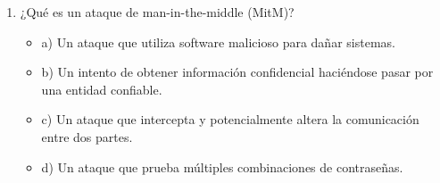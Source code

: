 \documentclass[a4paper]{article}
\begin{document}
\begin{enumerate}
    

    \item ¿Qué es un ataque de man-in-the-middle (MitM)?
    \begin{itemize}
        \item a) Un ataque que utiliza software malicioso para dañar sistemas.
        \item b) Un intento de obtener información confidencial haciéndose pasar por una entidad confiable.
        \item c) Un ataque que intercepta y potencialmente altera la comunicación entre dos partes.
        \item d) Un ataque que prueba múltiples combinaciones de contraseñas.
    \end{itemize}
\end{enumerate}


  
\end{document}
